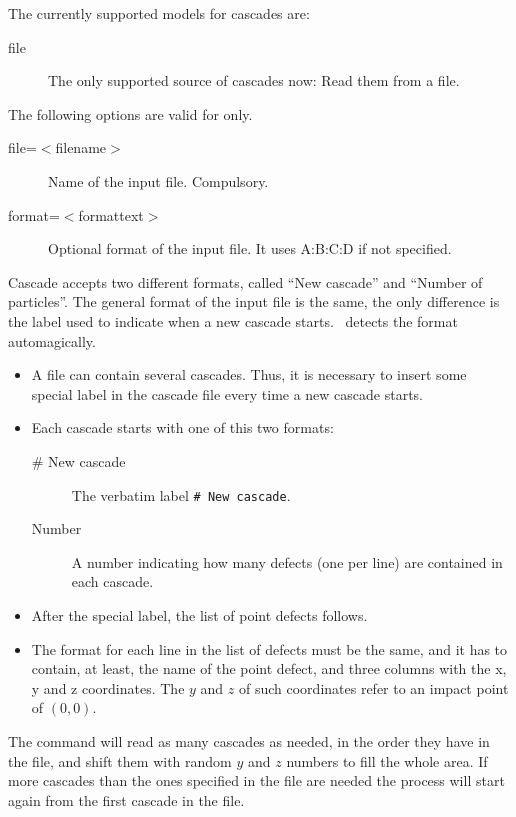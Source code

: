 The currently supported models for cascades are:
\begin{description}
\item [file] The only supported source of cascades now: Read them from a file.
\end{description}

The following options are valid for  only.

\begin{description}
\item[file=$<$filename$>$] Name of the input file. Compulsory.
\item[format=$<$formattext$>$] Optional format of the input file. It uses A:B:C:D if not specified.
\end{description}

Cascade accepts two different formats, called ``New cascade'' and ``Number of particles''. The general format of the input file is the same, the only difference is the label used to indicate when a new cascade starts. \MMonCa\ detects the format automagically.
\begin{itemize}
\item A file can contain several cascades. Thus, it is necessary to insert some special label in the cascade file every time a new cascade starts.
\item Each cascade starts with one of this two formats:
\begin{description}
\item[\# New cascade] The verbatim label \verb+# New cascade+. 
\item[Number] A number indicating how many defects (one per line) are contained in each cascade.
\end{description}
\item After the special label, the list of point defects follows.
\item The format for each line in the list of defects must be the same, and it has to contain, at least, the name of the point defect, and three columns with  the x, y and z coordinates. The $y$ and $z$ of such coordinates refer to an impact point of $(0,0)$.
\end{itemize}

The  command will read as many cascades as needed, in the order they have in the file, and shift them with random $y$ and $z$ numbers to fill the whole area. If more cascades than the ones specified in the file are needed the process will start again from the first cascade in the file.

